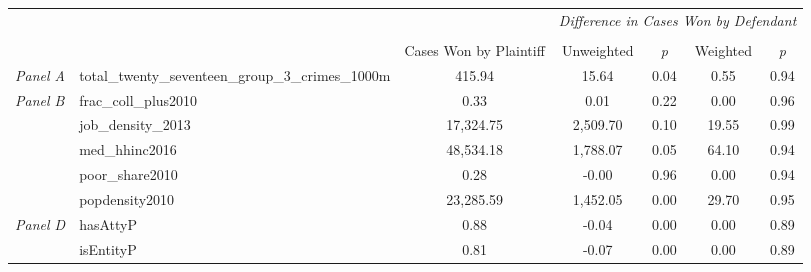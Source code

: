 \begin{tabular}{llccccc}
\toprule
 &  & \textit{} & \multicolumn{4}{c}{\textit{Difference in Cases Won by Defendant}} \\
\cline{4-7}
\\
 &  & Cases Won by Plaintiff & Unweighted & \emph{p} & Weighted & \emph{p} \\
\midrule
\textit{Panel A} & total_twenty_seventeen_group_3_crimes_1000m & 415.94 & 15.64 & 0.04 & 0.55 & 0.94 \\
\cline{1-7}
\multirow[c]{5}{3cm}{\textit{Panel B}} & frac_coll_plus2010 & 0.33 & 0.01 & 0.22 & 0.00 & 0.96 \\
 & job_density_2013 & 17,324.75 & 2,509.70 & 0.10 & 19.55 & 0.99 \\
 & med_hhinc2016 & 48,534.18 & 1,788.07 & 0.05 & 64.10 & 0.94 \\
 & poor_share2010 & 0.28 & -0.00 & 0.96 & 0.00 & 0.94 \\
 & popdensity2010 & 23,285.59 & 1,452.05 & 0.00 & 29.70 & 0.95 \\
\cline{1-7}
\multirow[c]{2}{3cm}{\textit{Panel D}} & hasAttyP & 0.88 & -0.04 & 0.00 & 0.00 & 0.89 \\
 & isEntityP & 0.81 & -0.07 & 0.00 & 0.00 & 0.89 \\
\cline{1-7}
\bottomrule
\end{tabular}
